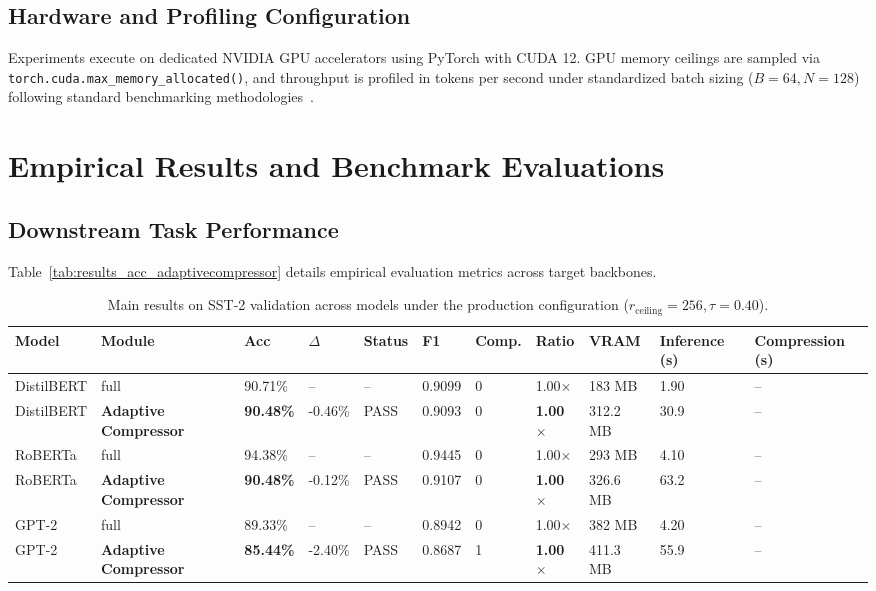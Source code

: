 \subsection{Hardware and Profiling Configuration}
Experiments execute on dedicated NVIDIA GPU accelerators using PyTorch with CUDA 12. GPU memory ceilings are sampled via \texttt{torch.cuda.max\_memory\_allocated()}, and throughput is profiled in tokens per second under standardized batch sizing ($B=64, N=128$) following standard benchmarking methodologies~\citep{kwon2023pagedattention,horowitz2014,strubell2019}.


\section{Empirical Results and Benchmark Evaluations}

\subsection{Downstream Task Performance}
Table~\ref{tab:results_acc_adaptivecompressor} details empirical evaluation metrics across target backbones.

\begin{table}[t]
\centering
\small
\begin{tabular}{lllllllllll}
\toprule
\textbf{Model} & \textbf{Module} & \textbf{Acc} & \textbf{$\Delta$} & \textbf{Status} & \textbf{F1} & \textbf{Comp.} & \textbf{Ratio} & \textbf{VRAM} & \textbf{Inference (s)} & \textbf{Compression (s)} \\
\midrule
DistilBERT & full & 90.71\% & -- & -- & 0.9099 & 0 & 1.00$\times$ & 183 MB & 1.90 & -- \\
DistilBERT & \textbf{Adaptive Compressor} & \textbf{90.48\%} & -0.46\% & PASS & 0.9093 & 0 & \textbf{1.00$\times$} & 312.2 MB & 30.9 & -- \\
RoBERTa & full & 94.38\% & -- & -- & 0.9445 & 0 & 1.00$\times$ & 293 MB & 4.10 & -- \\
RoBERTa & \textbf{Adaptive Compressor} & \textbf{90.48\%} & -0.12\% & PASS & 0.9107 & 0 & \textbf{1.00$\times$} & 326.6 MB & 63.2 & -- \\
GPT-2 & full & 89.33\% & -- & -- & 0.8942 & 0 & 1.00$\times$ & 382 MB & 4.20 & -- \\
GPT-2 & \textbf{Adaptive Compressor} & \textbf{85.44\%} & -2.40\% & PASS & 0.8687 & 1 & \textbf{1.00$\times$} & 411.3 MB & 55.9 & -- \\
\bottomrule
\end{tabular}
\caption{Main results on SST-2 validation across models under the production configuration ($r_{\mathrm{ceiling}}=256, \tau=0.40$).}
\label{tab:main_sst2}
\end{table}

